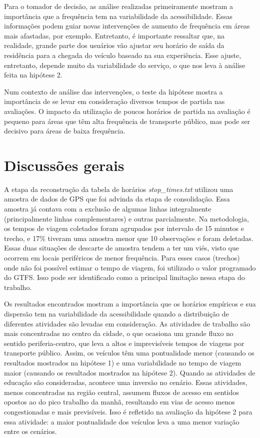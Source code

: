 \documentclass[        
    a4paper,          %
    12pt,             %
    chapter=TITLE,    %
    section=Title,    %
    subsection=Title, %
    oneside,          %
    english,          %
    spanish,          %
    brazil,           %
    fleqn             %
]{abntex2}
\begin{document}
  Para o tomador de decisão, as análise realizadas primeiramente mostram a importância que a frequência tem na variabilidade da acessibilidade. Essas informações podem guiar novas intervenções de aumento de frequência em áreas mais afastadas, por exemplo. Entretanto, é importante ressaltar que, na realidade, grande parte dos usuários vão ajustar seu horário de saída da residência para a chegada do veículo baseado na sua experiência. Esse ajuste, entretanto, depende muito da variabilidade do serviço, o que nos leva à análise feita na hipótese 2.
  
  Num contexto de análise das intervenções, o teste da hipótese mostra a importância de se levar em consideração diversos tempos de partida nas avaliações. O impacto da utilização de poucos horários de partida na avaliação é pequeno para áreas que têm alta frequência de transporte público, mas pode ser decisivo para áreas de baixa frequência.
  
  \hypertarget{discussoes-gerais}{%
  \section{Discussões gerais}\label{discussoes-gerais}}
  
  A etapa da reconstrução da tabela de horários \emph{stop\_times.txt} utilizou uma amostra de dados de GPS que foi advinda da etapa de consolidação. Essa amostra já contava com a exclusão de algumas linhas integralmente (principalmente linhas complementares) e outras parcialmente. Na metodologia, os tempos de viagem coletados foram agrupados por intervalo de 15 minutos e trecho, e 17\% tiveram uma amostra menor que 10 observações e foram deletadas. Essas duas situações de descarte de amostra tendem a ter um viés, visto que ocorrem em locais periféricos de menor frequência. Para esses casos (trechos) onde não foi possível estimar o tempo de viagem, foi utilizado o valor programado do GTFS. Isso pode ser identificado como a principal limitação nessa etapa do trabalho.
  
  Os resultados encontrados mostram a importância que os horários empíricos e sua dispersão tem na variabilidade da acessibilidade quando a distribuição de diferentes atividades são levadas em consideração. As atividades de trabalho são mais concentradas no centro da cidade, o que ocasiona um grande fluxo no sentido periferia-centro, que leva a altos e imprevisíveis tempos de viagens por transporte público. Assim, os veículos têm uma pontualidade menor (causando os resultados mostrados na hipótese 1) e uma variabilidade no tempo de viagem maior (causando os resultados mostrados na hipótese 2). Quando as atividades de educação são consideradas, acontece uma inversão no cenário. Essas atividades, menos concentradas na região central, assumem fluxos de acesso em sentidos opostos ao do pico trabalho da manhã, resultando em vias de acesso menos congestionadas e mais previsíveis. Isso é refletido na avaliação da hipótese 2 para essa atividade: a maior pontualidade dos veículos leva a uma menor variação entre os cenários.
  
\end{document}
